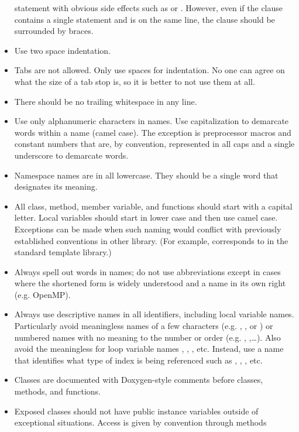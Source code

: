 \begin{itemize}
  statement with obvious side effects such as  or
  . However, even if the clause contains a single statement
  and is on the same line, the clause should be surrounded by braces.
\item Use two space indentation.
\item Tabs are not allowed. Only use spaces for indentation. No one can
  agree on what the size of a tab stop is, so it is better to not use them
  at all.
\item There should be no trailing whitespace in any line.
\item Use only alphanumeric characters in names. Use capitalization to
  demarcate words within a name (camel case). The exception is preprocessor
  macros and constant numbers that are, by convention, represented in all
  caps and a single underscore to demarcate words.
\item Namespace names are in all lowercase. They should be a single word
  that designates its meaning.
\item All class, method, member variable, and functions should start with a
  capital letter. Local variables should start in lower case and then use
  camel case. Exceptions can be made when such naming would conflict with
  previously established conventions in other library. (For example,
   corresponds to  in the
  standard template library.)
\item Always spell out words in names; do not use abbreviations except in
  cases where the shortened form is widely understood and a name in its own
  right (e.g. OpenMP).
\item Always use descriptive names in all identifiers, including local
  variable names. Particularly avoid meaningless names of a few characters
  (e.g. , , or ) or numbered names
  with no meaning to the number or order (e.g. ,
  ,\ldots). Also avoid the meaningless for loop variable
  names , , , etc. Instead, use a name
  that identifies what type of index is being referenced such as
  , , ,
  etc.
\item Classes are documented with Doxygen-style comments before classes,
  methods, and functions.
\item Exposed classes should not have public instance variables outside of
  exceptional situations. Access is given by convention through methods

\end{itemize}
